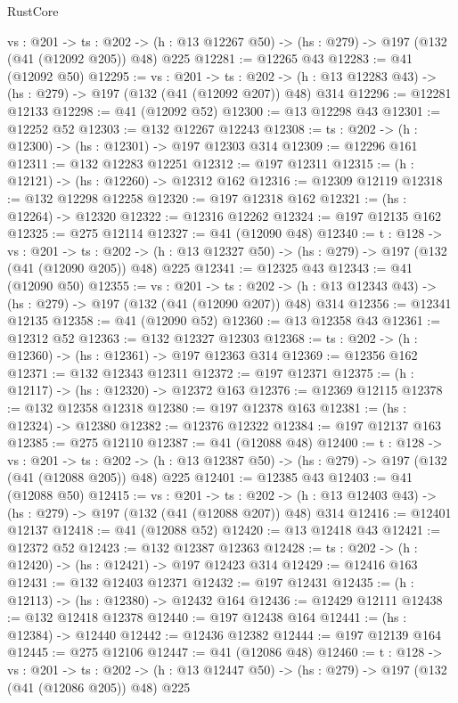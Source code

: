 \begin{lexlean}{RustCore}
\begin{coremodule}
  {vs : @201} ->
  {ts : @202} -> (h : @13 @12267 @50) -> (hs : @279) -> @197 (@132 (@41 (@12092 @205)) @48) @225
@12281 := @12265 @43
@12283 := @41 (@12092 @50)
@12295 := {vs : @201} ->
  {ts : @202} -> (h : @13 @12283 @43) -> (hs : @279) -> @197 (@132 (@41 (@12092 @207)) @48) @314
@12296 := @12281 @12133
@12298 := @41 (@12092 @52)
@12300 := @13 @12298 @43
@12301 := @12252 @52
@12303 := @132 @12267 @12243
@12308 := {ts : @202} -> (h : @12300) -> (hs : @12301) -> @197 @12303 @314
@12309 := @12296 @161
@12311 := @132 @12283 @12251
@12312 := @197 @12311
@12315 := (h : @12121) -> (hs : @12260) -> @12312 @162
@12316 := @12309 @12119
@12318 := @132 @12298 @12258
@12320 := @197 @12318 @162
@12321 := (hs : @12264) -> @12320
@12322 := @12316 @12262
@12324 := @197 @12135 @162
@12325 := @275 @12114
@12327 := @41 (@12090 @48)
@12340 := {t : @128} ->
  {vs : @201} ->
  {ts : @202} -> (h : @13 @12327 @50) -> (hs : @279) -> @197 (@132 (@41 (@12090 @205)) @48) @225
@12341 := @12325 @43
@12343 := @41 (@12090 @50)
@12355 := {vs : @201} ->
  {ts : @202} -> (h : @13 @12343 @43) -> (hs : @279) -> @197 (@132 (@41 (@12090 @207)) @48) @314
@12356 := @12341 @12135
@12358 := @41 (@12090 @52)
@12360 := @13 @12358 @43
@12361 := @12312 @52
@12363 := @132 @12327 @12303
@12368 := {ts : @202} -> (h : @12360) -> (hs : @12361) -> @197 @12363 @314
@12369 := @12356 @162
@12371 := @132 @12343 @12311
@12372 := @197 @12371
@12375 := (h : @12117) -> (hs : @12320) -> @12372 @163
@12376 := @12369 @12115
@12378 := @132 @12358 @12318
@12380 := @197 @12378 @163
@12381 := (hs : @12324) -> @12380
@12382 := @12376 @12322
@12384 := @197 @12137 @163
@12385 := @275 @12110
@12387 := @41 (@12088 @48)
@12400 := {t : @128} ->
  {vs : @201} ->
  {ts : @202} -> (h : @13 @12387 @50) -> (hs : @279) -> @197 (@132 (@41 (@12088 @205)) @48) @225
@12401 := @12385 @43
@12403 := @41 (@12088 @50)
@12415 := {vs : @201} ->
  {ts : @202} -> (h : @13 @12403 @43) -> (hs : @279) -> @197 (@132 (@41 (@12088 @207)) @48) @314
@12416 := @12401 @12137
@12418 := @41 (@12088 @52)
@12420 := @13 @12418 @43
@12421 := @12372 @52
@12423 := @132 @12387 @12363
@12428 := {ts : @202} -> (h : @12420) -> (hs : @12421) -> @197 @12423 @314
@12429 := @12416 @163
@12431 := @132 @12403 @12371
@12432 := @197 @12431
@12435 := (h : @12113) -> (hs : @12380) -> @12432 @164
@12436 := @12429 @12111
@12438 := @132 @12418 @12378
@12440 := @197 @12438 @164
@12441 := (hs : @12384) -> @12440
@12442 := @12436 @12382
@12444 := @197 @12139 @164
@12445 := @275 @12106
@12447 := @41 (@12086 @48)
@12460 := {t : @128} ->
  {vs : @201} ->
  {ts : @202} -> (h : @13 @12447 @50) -> (hs : @279) -> @197 (@132 (@41 (@12086 @205)) @48) @225

\end{coremodule}
\end{lexlean}
